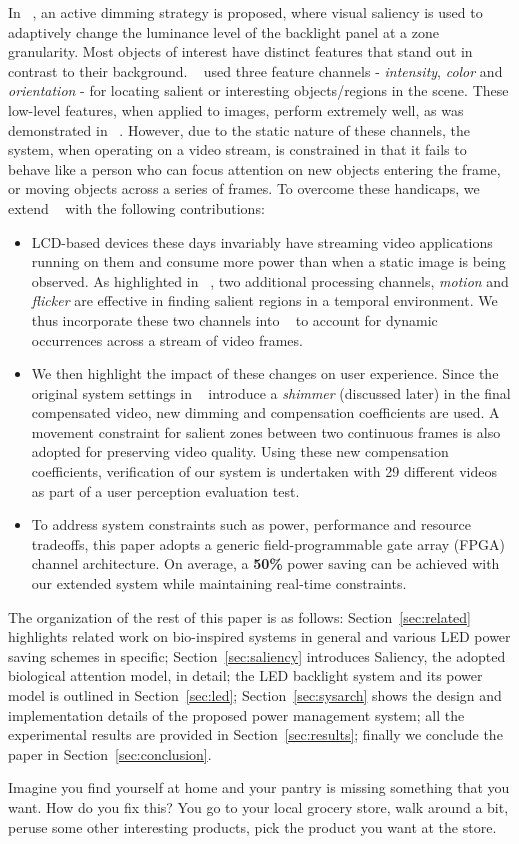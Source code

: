 In ~\cite{DATE2013}, an active dimming strategy is proposed, where visual saliency 
is used to adaptively change the luminance level of the backlight panel at a zone granularity. Most objects of interest
have distinct features that stand out in contrast to their background. 
~\cite{DATE2013} used three feature channels - \emph{intensity}, \emph{color} and \emph{orientation} - for locating salient or 
interesting objects/regions in the scene. These low-level features, when applied to images, 
perform extremely well, as was demonstrated in ~\cite{DATE2013}. However, due to the static nature of these 
channels, the system, when operating on a video stream, is constrained in that it fails to behave 
like a person who can focus attention on new objects entering the frame, or moving objects across a series of frames. 
To overcome these handicaps, we extend ~\cite{DATE2013} with the following contributions:
\begin{itemize}
\item
LCD-based devices these days invariably have streaming video applications running on them and consume more power than when a static image is being observed. 
As highlighted in ~\cite{Peters2007}, two additional processing channels, \emph{motion} and \emph{flicker} are effective in finding salient regions 
in a temporal environment. We thus incorporate these two channels into ~\cite{DATE2013} to account for dynamic occurrences 
across a stream of video frames.
\item
We then highlight the impact of these changes on user experience. 
Since the original system settings in ~\cite{DATE2013} introduce a \emph{shimmer} (discussed later) in the final compensated video, 
new dimming and compensation coefficients are used. A movement constraint for salient zones between two 
continuous frames is also adopted for preserving video quality.
Using these new compensation coefficients, verification of our system is undertaken with 29 different videos as part of a user perception evaluation test.
\item 
To address system constraints such as power, performance and resource tradeoffs,
this paper adopts a generic field-programmable gate array (FPGA) channel architecture. 
On average, a \textbf{50\%} power saving can be achieved with our extended system while maintaining real-time constraints. 
\end{itemize}
The organization of the rest of this paper is as follows: Section~\ref{sec:related} highlights related work on bio-inspired systems in general and various LED power saving schemes in specific; Section~\ref{sec:saliency} introduces Saliency, the adopted biological attention model, in detail; the LED backlight system and its power model is outlined in Section~\ref{sec:led}; Section~\ref{sec:sysarch} shows the design and implementation details of the proposed power management system; all the experimental results are provided in Section~\ref{sec:results}; finally we conclude the paper in Section~\ref{sec:conclusion}.


Imagine you find yourself at home and your pantry is missing something that you want. How do you fix this? You go to your local grocery store, walk around a bit, peruse some other interesting products, pick the product you want at the store. 

